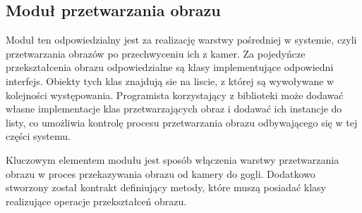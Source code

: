 \documentclass[a4paper,11pt,twoside]{report}
\theoremstyle{definition}
\begin{document}
\subsection{Moduł przetwarzania obrazu}

Moduł ten odpowiedzialny jest za realizację warstwy pośredniej w  systemie, czyli przetwarzania obrazów po przechwyceniu ich z kamer. Za pojedyńcze przekształcenia obrazu odpowiedzialne są klasy implementujące odpowiedni interfejs. Obiekty tych klas znajdują sie na liscie, z której są wywoływane w kolejności występowania. Programista korzystający z biblioteki może dodawać własne implementacje klas przetwarzających obraz i dodawać ich instancje do listy, co umożliwia kontrolę procesu przetwarzania obrazu odbywającego się w tej części systemu. 

Kluczowym elementem modułu jest sposób włączenia warstwy przetwarzania obrazu w proces przekazywania obrazu od kamery do gogli. Dodatkowo stworzony został kontrakt definiujący metody, które muszą posiadać klasy realizujące operacje przekształceń obrazu.

\pagebreak
\end{document}
